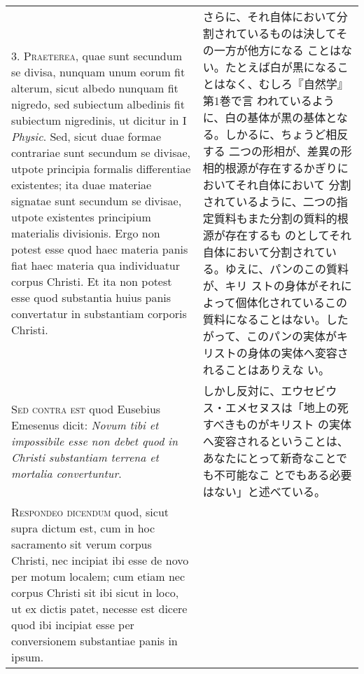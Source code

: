 \documentclass[10pt]{jsarticle} %
\begin{document}
\begin{longtable}{p{21em}p{21em}}
\\



3. {\scshape Praeterea}, quae sunt secundum se divisa, nunquam unum
eorum fit alterum, sicut albedo nunquam fit nigredo, sed subiectum
albedinis fit subiectum nigredinis, ut dicitur in I {\itshape
Physic}. Sed, sicut duae formae contrariae sunt secundum se divisae,
utpote principia formalis differentiae existentes; ita duae materiae
signatae sunt secundum se divisae, utpote existentes principium
materialis divisionis. Ergo non potest esse quod haec materia panis
fiat haec materia qua individuatur corpus Christi. Et ita non potest
esse quod substantia huius panis convertatur in substantiam corporis
Christi.

&

さらに、それ自体において分割されているものは決してその一方が他方になる
ことはない。たとえば白が黒になることはなく、むしろ『自然学』第1巻で言
われているように、白の基体が黒の基体となる。しかるに、ちょうど相反する
二つの形相が、差異の形相的根源が存在するかぎりにおいてそれ自体において
分割されているように、二つの指定質料もまた分割の質料的根源が存在するも
のとしてそれ自体において分割されている。ゆえに、パンのこの質料が、キリ
ストの身体がそれによって個体化されているこの質料になることはない。した
がって、このパンの実体がキリストの身体の実体へ変容されることはありえな
い。



\\



{\scshape Sed contra est} quod Eusebius Emesenus dicit: {\itshape
Novum tibi et impossibile esse non debet quod in Christi substantiam
terrena et mortalia convertuntur}.

&

しかし反対に、エウセビウス・エメセヌスは「地上の死すべきものがキリスト
の実体へ変容されるということは、あなたにとって新奇なことでも不可能なこ
とでもある必要はない」と述べている。

\\



{\scshape Respondeo dicendum} quod, sicut supra dictum est, cum in hoc
sacramento sit verum corpus Christi, nec incipiat ibi esse de novo per
motum localem; cum etiam nec corpus Christi sit ibi sicut in loco, ut
ex dictis patet, necesse est dicere quod ibi incipiat esse per
conversionem substantiae panis in ipsum.


&


\end{longtable}
\end{document}
